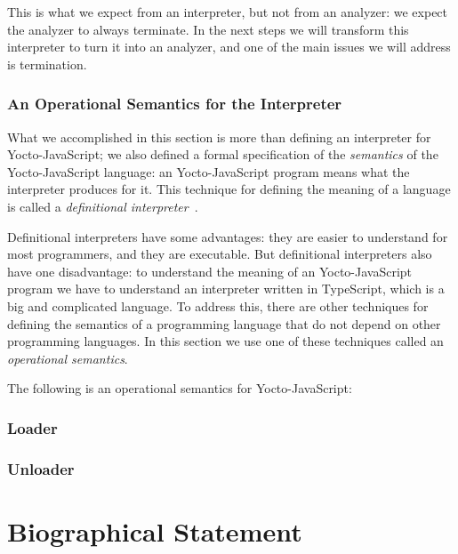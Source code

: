 \documentclass[12pt, oneside]{book}
\begin{document}
This is what we expect from an interpreter, but not from an analyzer: we expect the analyzer to always terminate. In the next steps we will transform this interpreter to turn it into an analyzer, and one of the main issues we will address is termination.

\subsection{An Operational Semantics for the Interpreter}

What we accomplished in this section is more than defining an interpreter for Yocto-JavaScript; we also defined a formal specification of the \emph{semantics} of the Yocto-JavaScript language: an Yocto-JavaScript program means what the interpreter produces for it. This technique for defining the meaning of a language is called a \emph{definitional interpreter}~\cite{definitional-interpreters}.

Definitional interpreters have some advantages: they are easier to understand for most programmers, and they are executable. But definitional interpreters also have one disadvantage: to understand the meaning of an Yocto-JavaScript program we have to understand an interpreter written in TypeScript, which is a big and complicated language. To address this, there are other techniques for defining the semantics of a programming language that do not depend on other programming languages. In this section we use one of these techniques called an \emph{operational semantics}.

The following is an operational semantics for Yocto-JavaScript:


\subsection{Loader}
\label{Step 0: Loader}


\subsection{Unloader}
\label{Step 0: Unloader}


\appendix

\backmatter




\chapter{Biographical Statement}

\end{document}
